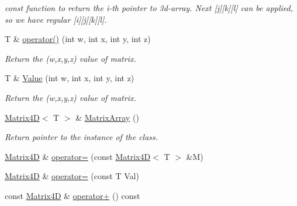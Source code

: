 \begin{DoxyCompactItemize}
\begin{DoxyCompactList}\small\item\em const function to return the i-\/th pointer to 3d-\/array. Next \mbox{[}j\mbox{]}\mbox{[}k\mbox{]}\mbox{[}l\mbox{]} can be applied, so we have regular \mbox{[}i\mbox{]}\mbox{[}j\mbox{]}\mbox{[}k\mbox{]}\mbox{[}l\mbox{]}. \end{DoxyCompactList}\item 
T \& \hyperlink{class_matrix4_d_a2b4696749011a90e6b8e3c22cc564556}{operator()} (int w, int x, int y, int z)
\begin{DoxyCompactList}\small\item\em Return the (w,x,y,z) value of matrix. \end{DoxyCompactList}\item 
\hypertarget{class_matrix4_d_ab3128aecc516b8047b30c6d618a149cf}{}T \& \hyperlink{class_matrix4_d_ab3128aecc516b8047b30c6d618a149cf}{Value} (int w, int x, int y, int z)\label{class_matrix4_d_ab3128aecc516b8047b30c6d618a149cf}

\begin{DoxyCompactList}\small\item\em Return the (w,x,y,z) value of matrix. \end{DoxyCompactList}\item 
\hypertarget{class_matrix4_d_ad3f9d57106b8a534c3fe57ca7c645195}{}\hyperlink{class_matrix4_d}{Matrix4\+D}$<$ T $>$ \& \hyperlink{class_matrix4_d_ad3f9d57106b8a534c3fe57ca7c645195}{Matrix\+Array} ()\label{class_matrix4_d_ad3f9d57106b8a534c3fe57ca7c645195}

\begin{DoxyCompactList}\small\item\em Return pointer to the instance of the class. \end{DoxyCompactList}\item 
\hyperlink{class_matrix4_d}{Matrix4\+D} \& \hyperlink{class_matrix4_d_aae1f421055b4dc3b84759ca236980418}{operator=} (const \hyperlink{class_matrix4_d}{Matrix4\+D}$<$ T $>$ \&M)
\item 
\hyperlink{class_matrix4_d}{Matrix4\+D} \& \hyperlink{class_matrix4_d_a89d84d26cb35499e32e2d9fef5057f19}{operator=} (const T Val)
\item 
\hypertarget{class_matrix4_d_a8ad06dcf839fba2d93aef4bac54ecf72}{}const \hyperlink{class_matrix4_d}{Matrix4\+D} \& \hyperlink{class_matrix4_d_a8ad06dcf839fba2d93aef4bac54ecf72}{operator+} () const \label{class_matrix4_d_a8ad06dcf839fba2d93aef4bac54ecf72}


\end{DoxyCompactItemize}
